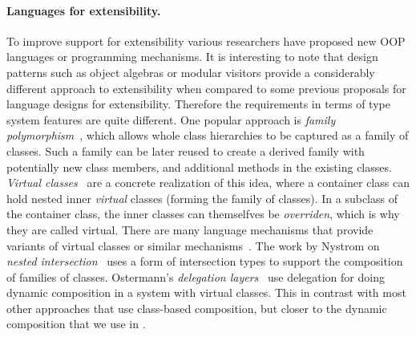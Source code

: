 \paragraph{Languages for extensibility.}
To improve support for extensibility various researchers have proposed
new OOP languages or programming mechanisms. It is interesting to
note that design patterns such as object algebras or modular visitors
provide a considerably different approach to extensibility when
compared to some previous proposals for language designs for
extensibility. Therefore the requirements in terms of type system
features are quite different.  One popular approach is \emph{family
  polymorphism}~\cite{Ernst01family}, which allows whole class hierarchies to be
captured as a family of classes. Such a family can be later reused to
create a derived family with potentially new class members, and
additional methods in the existing classes.  \emph{Virtual
  classes}~\cite{ernst2006virtual} are a concrete realization of this idea, where a
container class can hold nested inner \emph{virtual} classes (forming
the family of classes). In a subclass of the container class, the
inner classes can themselfves be \emph{overriden}, which is why they
are called virtual. There are many language mechanisms that provide
variants of virtual classes or similar mechanisms~\cite{McDirmid01Jiazzi,Aracic06CaesarJ,Smaragdakis98mixin,nystrom2006j}. The work by
Nystrom on \emph{nested intersection}~\cite{nystrom2006j} uses a
form of intersection types to support the composition of
families of classes. Ostermann's \emph{delegation layers}~\cite{Ostermann02dynamically}
use delegation for doing dynamic composition in a system
with virtual classes. This in contrast with most other approaches
that use class-based composition, but closer to the dynamic
composition that we use in \name.
\begin{comment}
In contrast to type systems for virtual classes
and similar mechanisms, the goal of our work is to study the type
systems and basic language mechanism to better support such design patterns.
 some researchers have designed new type
system features such as virtual classes~\cite{ernst2006virtual}, polymorphic
variants~\cite{garrigue1998programming}, while others have shown employing
programming pattern such as object algebras~\cite{oliveira2012extensibility} by
using features within existing programming languages. Both of the two approaches
have drawbacks of some kind. The first approach often involves heavyweight
designs, while the second approach still sacrifices the readability for
extensibility.
\bruno{fill me in with more details and more references!}
\end{comment}

